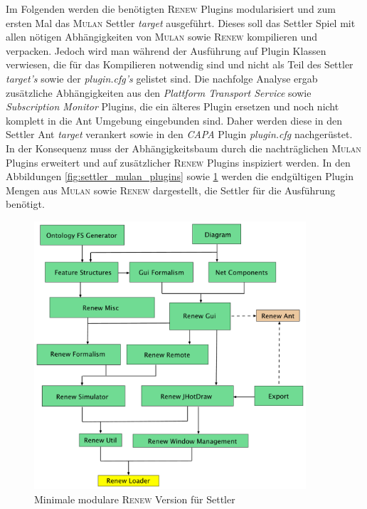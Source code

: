 	Im Folgenden werden die benötigten \textsc{Renew} Plugins modularisiert und zum ersten Mal das \textsc{Mulan} Settler \textit{target} ausgeführt. Dieses soll das Settler Spiel mit allen nötigen Abhängigkeiten von \textsc{Mulan} sowie \textsc{Renew} kompilieren und verpacken. Jedoch wird man während der Ausführung auf Plugin Klassen verwiesen, die für das Kompilieren notwendig sind und nicht als Teil des Settler \textit{target's} sowie der \textit{plugin.cfg's} gelistet sind. \newline
	Die nachfolge Analyse ergab zusätzliche Abhängigkeiten aus den \textit{Plattform Transport Service} sowie \textit{Subscription Monitor} Plugins, die ein älteres Plugin ersetzen und noch nicht komplett in die Ant Umgebung eingebunden sind. Daher werden diese in den Settler Ant \textit{target} verankert sowie in den \textit{CAPA} Plugin \textit{plugin.cfg} nachgerüstet. In der Konsequenz muss der Abhängigkeitsbaum durch die nachträglichen \textsc{Mulan} Plugins erweitert und auf zusätzlicher \textsc{Renew} Plugins inspiziert werden. \newline
	In den Abbildungen \ref{fig:settler_mulan_plugins} sowie \ref{fig:renew_mulan_plugins} werden die endgültigen Plugin Mengen aus \textsc{Mulan} sowie \textsc{Renew} dargestellt, die Settler für die Ausführung benötigt. \bigbreak

	\begin{figure}[h!]
	  \centering
	  \includegraphics[width=0.9\textwidth]{material/images/settler-renew-tree-extend.pdf}
	  \caption{Minimale modulare \textsc{Renew} Version für Settler}
	  \label{fig:renew_mulan_plugins}
	\end{figure}	

